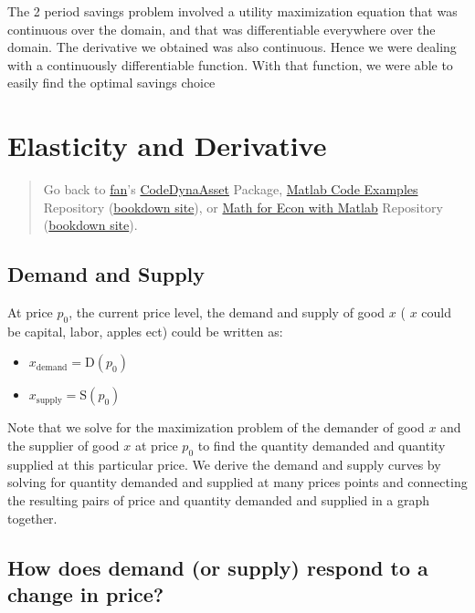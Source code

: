 \documentclass[
]{book}
\begin{document}
The 2 period savings problem involved a utility maximization equation
that was continuous over the domain, and that was differentiable
everywhere over the domain. The derivative we obtained was also
continuous. Hence we were dealing with a continuously differentiable
function. With that function, we were able to easily find the optimal
savings choice

\hypertarget{elasticity-and-derivative}{%
\section{Elasticity and Derivative}\label{elasticity-and-derivative}}

\begin{quote}
Go back to \href{http://fanwangecon.github.io/}{fan}'s \href{https://fanwangecon.github.io/CodeDynaAsset/}{CodeDynaAsset} Package, \href{https://fanwangecon.github.io/M4Econ/}{Matlab Code Examples} Repository (\href{https://fanwangecon.github.io/M4Econ/bookdown}{bookdown site}), or \href{https://fanwangecon.github.io/Math4Econ/}{Math for Econ with Matlab} Repository (\href{https://fanwangecon.github.io/Math4Econ/bookdown}{bookdown site}).
\end{quote}

\hypertarget{demand-and-supply}{%
\subsection{Demand and Supply}\label{demand-and-supply}}

At price \(p_0\), the current price level, the demand and supply of good
\(x\) ( \(x\) could be capital, labor, apples ect) could be written as:

\begin{itemize}
\item
  \(\displaystyle x_{\textrm{demand}} =\textrm{D}(p_0 )\)
\item
  \(\displaystyle x_{\textrm{supply}} =\textrm{S}(p_0 )\)
\end{itemize}

Note that we solve for the maximization problem of the demander of good
\(x\) and the supplier of good \(x\) at price \(p_0\) to find the quantity
demanded and quantity supplied at this particular price. We derive the
demand and supply curves by solving for quantity demanded and supplied
at many prices points and connecting the resulting pairs of price and
quantity demanded and supplied in a graph together.

\hypertarget{how-does-demand-or-supply-respond-to-a-change-in-price}{%
\subsection{How does demand (or supply) respond to a change in price?}\label{how-does-demand-or-supply-respond-to-a-change-in-price}}
\end{document}
